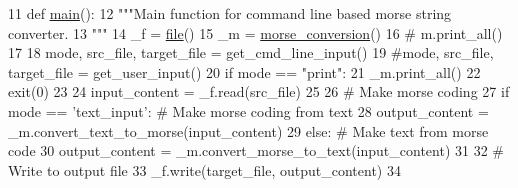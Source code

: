 \begin{DoxyCode}
11 \textcolor{keyword}{def }\mbox{\hyperlink{namespacemorse__main_a76d936650259b2059dd69cfe7a501ff8}{main}}():
12     \textcolor{stringliteral}{"""Main function for command line based morse string converter.}
13 \textcolor{stringliteral}{    """}
14     \_f = \mbox{\hyperlink{namespacefile}{file}}()
15     \_m = \mbox{\hyperlink{namespacemorse__conversion}{morse\_conversion}}()
16     \textcolor{comment}{# m.print\_all()}
17 
18     mode, src\_file, target\_file = get\_cmd\_line\_input()
19     \textcolor{comment}{#mode, src\_file, target\_file = get\_user\_input()}
20     \textcolor{keywordflow}{if} mode == \textcolor{stringliteral}{"print"}:
21         \_m.print\_all()
22         exit(0)
23 
24     input\_content = \_f.read(src\_file)
25 
26     \textcolor{comment}{# Make morse coding}
27     \textcolor{keywordflow}{if} mode == \textcolor{stringliteral}{'text\_input'}: \textcolor{comment}{# Make morse coding from text}
28         output\_content = \_m.convert\_text\_to\_morse(input\_content)
29     \textcolor{keywordflow}{else}:  \textcolor{comment}{# Make text from morse code}
30         output\_content = \_m.convert\_morse\_to\_text(input\_content)
31 
32     \textcolor{comment}{# Write to output file}
33     \_f.write(target\_file, output\_content)
34 
\end{DoxyCode}
